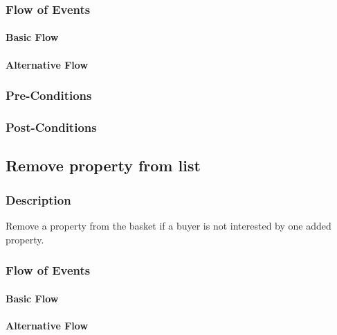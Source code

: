 \documentclass[a4paper,12pt]{article}
\begin{document}
\subsubsection{Flow of Events}
\paragraph{Basic Flow}
\begin{itemize}
\end{itemize}

\paragraph{Alternative Flow}
\begin{itemize}
\end{itemize}

\subsubsection{Pre-Conditions}
\subsubsection{Post-Conditions}

\subsection{Remove property from list}
\subsubsection{Description}
Remove a property from the basket if a buyer is not interested by one added property.
\subsubsection{Flow of Events}
\paragraph{Basic Flow}
\begin{itemize}
\end{itemize}

\paragraph{Alternative Flow}
\begin{itemize}
\end{itemize}
\end{document}
